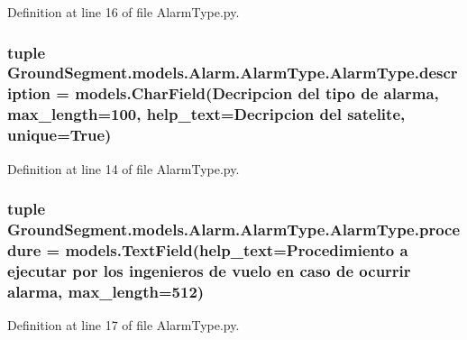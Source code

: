 Definition at line 16 of file Alarm\+Type.\+py.

\hypertarget{class_ground_segment_1_1models_1_1_alarm_1_1_alarm_type_1_1_alarm_type_a36cb958f8c0cb246dc2755299594b305}{}
\subsubsection[{description}]{\setlength{\rightskip}{0pt plus 5cm}tuple Ground\+Segment.\+models.\+Alarm.\+Alarm\+Type.\+Alarm\+Type.\+description = models.\+Char\+Field(\textquotesingle{}Decripcion del tipo de alarma\textquotesingle{}, max\+\_\+length=100, help\+\_\+text=\textquotesingle{}Decripcion del satelite\textquotesingle{}, unique=True)\hspace{0.3cm}{\ttfamily [static]}}\label{class_ground_segment_1_1models_1_1_alarm_1_1_alarm_type_1_1_alarm_type_a36cb958f8c0cb246dc2755299594b305}


Definition at line 14 of file Alarm\+Type.\+py.

\hypertarget{class_ground_segment_1_1models_1_1_alarm_1_1_alarm_type_1_1_alarm_type_a2ee12462c076bf934143f025e89694b0}{}
\subsubsection[{procedure}]{\setlength{\rightskip}{0pt plus 5cm}tuple Ground\+Segment.\+models.\+Alarm.\+Alarm\+Type.\+Alarm\+Type.\+procedure = models.\+Text\+Field(help\+\_\+text=\textquotesingle{}Procedimiento {\bf a} ejecutar por los ingenieros de vuelo en caso de ocurrir alarma\textquotesingle{}, max\+\_\+length=512)\hspace{0.3cm}{\ttfamily [static]}}\label{class_ground_segment_1_1models_1_1_alarm_1_1_alarm_type_1_1_alarm_type_a2ee12462c076bf934143f025e89694b0}


Definition at line 17 of file Alarm\+Type.\+py.

